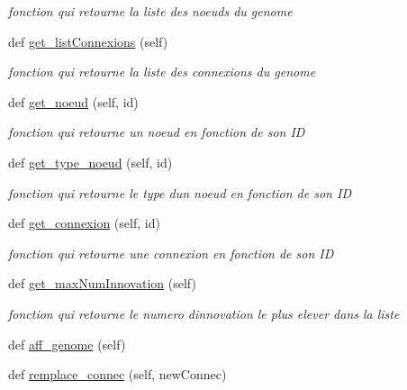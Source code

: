 \begin{DoxyCompactItemize}
\begin{DoxyCompactList}\small\item\em fonction qui retourne la liste des noeuds du genome \end{DoxyCompactList}\item 
def \hyperlink{classsrc_1_1_i_a_1_1genome_1_1_genome_a0df62962a25e45a73c0a0a4a899b8573}{get\+\_\+list\+Connexions} (self)
\begin{DoxyCompactList}\small\item\em fonction qui retourne la liste des connexions du genome \end{DoxyCompactList}\item 
def \hyperlink{classsrc_1_1_i_a_1_1genome_1_1_genome_a3ae6b59375d7cb648e6e65b299745136}{get\+\_\+noeud} (self, id)
\begin{DoxyCompactList}\small\item\em fonction qui retourne un noeud en fonction de son ID \end{DoxyCompactList}\item 
def \hyperlink{classsrc_1_1_i_a_1_1genome_1_1_genome_aacf83c150a5222a2502737adadf41d6e}{get\+\_\+type\+\_\+noeud} (self, id)
\begin{DoxyCompactList}\small\item\em fonction qui retourne le type d\textquotesingle{}un noeud en fonction de son ID \end{DoxyCompactList}\item 
def \hyperlink{classsrc_1_1_i_a_1_1genome_1_1_genome_a07ebf660dfb9962a4ceeb078537c5fb1}{get\+\_\+connexion} (self, id)
\begin{DoxyCompactList}\small\item\em fonction qui retourne une connexion en fonction de son ID \end{DoxyCompactList}\item 
def \hyperlink{classsrc_1_1_i_a_1_1genome_1_1_genome_a8a5bbeda2d4dafaf999bf8d0a096157d}{get\+\_\+max\+Num\+Innovation} (self)
\begin{DoxyCompactList}\small\item\em fonction qui retourne le numero d\textquotesingle{}innovation le plus elever dans la liste \end{DoxyCompactList}\item 
def \hyperlink{classsrc_1_1_i_a_1_1genome_1_1_genome_ae5bfcd0f717f5aa7ac272aacdeb1a95d}{aff\+\_\+genome} (self)
\item 
def \hyperlink{classsrc_1_1_i_a_1_1genome_1_1_genome_aed3a26c1418ec0b34d654c6f9464b709}{remplace\+\_\+connec} (self, new\+Connec)

\end{DoxyCompactItemize}
